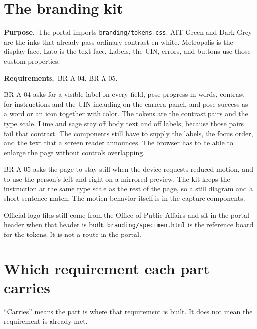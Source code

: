 \documentclass[11pt]{article}
\newcommand{\why}[1]{\textbf{Purpose.}\ #1\par}
\newcommand{\serves}[1]{\textbf{Requirements.}\ #1\par}
\begin{document}
\section{The branding kit}

\why{The portal imports \texttt{branding/tokens.css}. AIT Green and Dark Grey are the inks that already pass ordinary contrast on white. Metropolis is the display face. Lato is the text face. Labels, the UIN, errors, and buttons use those custom properties.}
\serves{BR-A-04, BR-A-05.}

BR-A-04 asks for a visible label on every field, pose progress in words, contrast for instructions and the UIN including on the camera panel, and pose success as a word or an icon together with color. The tokens are the contrast pairs and the type scale. Lime and sage stay off body text and off labels, because those pairs fail that contrast. The components still have to supply the labels, the focus order, and the text that a screen reader announces. The browser has to be able to enlarge the page without controls overlapping.

BR-A-05 asks the page to stay still when the device requests reduced motion, and to use the person's left and right on a mirrored preview. The kit keeps the instruction at the same type scale as the rest of the page, so a still diagram and a short sentence match. The motion behavior itself is in the capture components.

Official logo files still come from the Office of Public Affairs and sit in the portal header when that header is built. \texttt{branding/specimen.html} is the reference board for the tokens. It is not a route in the portal.

\section{Which requirement each part carries}

``Carries'' means the part is where that requirement is built. It does not mean the requirement is already met.
\end{document}
